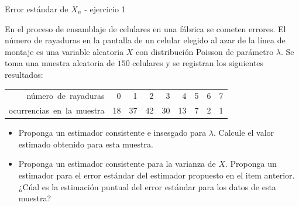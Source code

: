 \documentclass{beamer}
\theoremstyle{definition}
\begin{document}
\begin{frame}{\color{rosee}Error est\'andar de $\overline{X}_n$ - ejercicio 1}\small
  
    En el proceso de ensamblaje de celulares en una f\'abrica se cometen
    errores. El n\'umero de rayaduras en la pantalla de un celular
    elegido al azar de la l\'inea de montaje es una variable aleatoria
    $X$ con distribuci\'on Poisson de par\'ametro $\lambda$. Se toma una
    muestra aleatoria de $150$ celulares y se registran los siguientes
    resultados:
    \begin{table}
      \centering
      \begin{tabular}{|r|rrrrrrrr|}
        \hline
        \mbox{n\'umero de rayaduras}&0&1&2&3&4&5&6&7\\
        \mbox{ocurrencias en la muestra}&18&37&42&30&13&7&2&1\\
        \hline
      \end{tabular}
    \end{table}
    \begin{itemize}
    \item Proponga un estimador consistente e insesgado para
      $\lambda$. Calcule el valor estimado obtenido para esta muestra.
    \item Proponga un estimador consistente para la varianza
      de $X$. Proponga un estimador para el error est\'andar del
      estimador propuesto en el item anterior. ¿C\'ual es la estimación puntual del error
      est\'andar para los datos de esta muestra?
    \end{itemize}
  
\end{frame}
\end{document}
